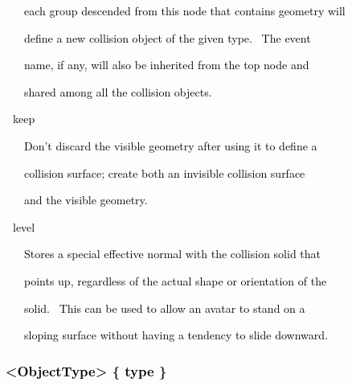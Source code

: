\documentclass[a4paper]{article}
\newcommand\textstyleOOoComputerKeyWord[1]{\textrm{\textcolor[rgb]{0.0,0.0,0.5019608}{#1}}}
\newcommand\textstyleOOoAssemblerSpecialChar[1]{\textrm{\textcolor[rgb]{0.0,0.5019608,0.0}{#1}}}
\newcommand\textstyleOOoAssemblerIdent[1]{\textrm{\textcolor{black}{#1}}}
\begin{document}
\clearpage
\bigskip

{\color{black}
\textstyleOOoComputerKeyWord{\textcolor{black}{\ \ \ \ \ \ each group descended from this node that contains geometry
will}}}

{\color{black}
\textstyleOOoComputerKeyWord{\textcolor{black}{\ \ \ \ \ \ define a new collision object of the given type. \ The
event}}}

{\color{black}
\textstyleOOoComputerKeyWord{\textcolor{black}{\ \ \ \ \ \ name, if any, will also be inherited from the top node and}}}

{\color{black}
\textstyleOOoComputerKeyWord{\textcolor{black}{\ \ \ \ \ \ shared among all the collision objects.}}}


\bigskip

{\color{black}
\textstyleOOoComputerKeyWord{\textcolor{black}{\ \ \ \ keep}}}


\bigskip

{\color{black}
\textstyleOOoComputerKeyWord{\textcolor{black}{\ \ \ \ \ \ Don't discard the visible geometry after using it to define
a}}}

{\color{black}
\textstyleOOoComputerKeyWord{\textcolor{black}{\ \ \ \ \ \ collision surface; create both an invisible collision
surface}}}

{\color{black}
\textstyleOOoComputerKeyWord{\textcolor{black}{\ \ \ \ \ \ and the visible geometry.}}}


\bigskip

{\color{black}
\textstyleOOoComputerKeyWord{\textcolor{black}{\ \ \ \ level}}}


\bigskip

{\color{black}
\textstyleOOoComputerKeyWord{\textcolor{black}{\ \ \ \ \ \ Stores a special effective normal with the collision solid
that}}}

{\color{black}
\textstyleOOoComputerKeyWord{\textcolor{black}{\ \ \ \ \ \ points up, regardless of the actual shape or orientation of
the}}}

{\color{black}
\textstyleOOoComputerKeyWord{\textcolor{black}{\ \ \ \ \ \ solid. \ This can be used to allow an avatar to stand on a}}}

{\color{black}
\textstyleOOoComputerKeyWord{\textcolor{black}{\ \ \ \ \ \ sloping surface without having a tendency to slide
downward.}}}


\bigskip


\bigskip

\subsubsection[\ \ {\textless}ObjectType{\textgreater} \{ type
\}]{\textstyleOOoComputerKeyWord{\textcolor{black}{\ \ }}\textstyleOOoAssemblerSpecialChar{{\textless}}\textstyleOOoAssemblerIdent{ObjectType}\textstyleOOoAssemblerSpecialChar{{\textgreater}}\textstyleOOoComputerKeyWord{\textcolor{black}{
}}\textstyleOOoAssemblerSpecialChar{\{}\textstyleOOoComputerKeyWord{\textcolor{black}{
}}\textstyleOOoAssemblerIdent{type}\textstyleOOoComputerKeyWord{\textcolor{black}{
}}\textstyleOOoAssemblerSpecialChar{\}}}
\hypertarget{RefHeading7708869075401}{}
\bigskip
\end{document}
